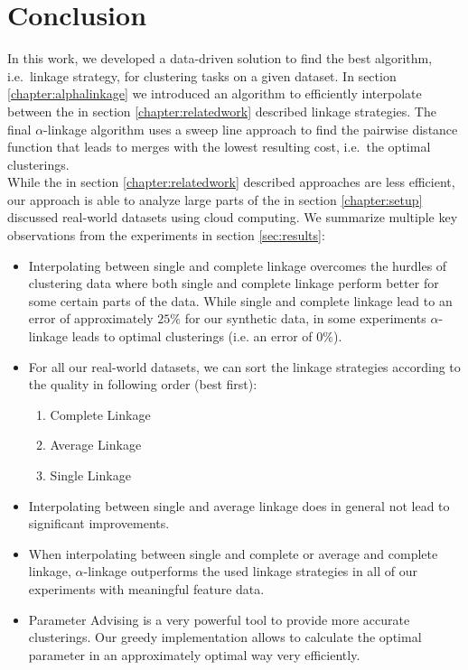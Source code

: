 \chapter{Conclusion}

In this work, we developed a data-driven solution to find the best algorithm, i.e.\ linkage strategy, for clustering tasks on a given dataset. In section \ref{chapter:alphalinkage} we introduced an algorithm to efficiently interpolate between the in section \ref{chapter:relatedwork} described linkage strategies. The final $\alpha$-linkage algorithm uses a sweep line approach to find the pairwise distance function that leads to merges with the lowest resulting cost, i.e.\ the optimal clusterings.\\

While the in section \ref{chapter:relatedwork} described approaches are less efficient, our approach is able to analyze large parts of the in section \ref{chapter:setup}  discussed real-world datasets using cloud computing. We summarize multiple key observations from the experiments in section \ref{sec:results}:
\begin{itemize}
\item Interpolating between single and complete linkage overcomes the hurdles of clustering data where both single and complete linkage perform better for some certain parts of the data. While single and complete linkage lead to an error of approximately $25\%$ for our synthetic data, in some experiments $\alpha$-linkage leads to optimal clusterings (i.e. an error of $0\%$).
\item For all our real-world datasets, we can sort the linkage strategies according to the quality in following order (best first):
\begin{enumerate}
\item Complete Linkage
\item Average Linkage
\item Single Linkage
\end{enumerate}
\item Interpolating between single and average linkage does in general not lead to significant improvements.
\item When interpolating between single and complete or average and complete linkage, $\alpha$-linkage outperforms the used linkage strategies in all of our experiments with meaningful feature data.
\item Parameter Advising is a very powerful tool to provide more accurate clusterings. Our greedy implementation allows to calculate the optimal parameter in an approximately optimal way very efficiently.
\end{itemize}

